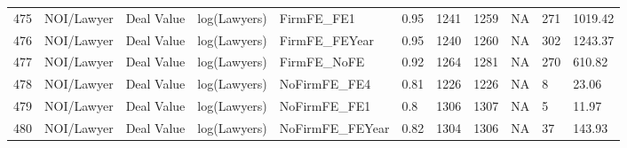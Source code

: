 \documentclass{article}
\begin{document}
\begin{table}[H]
\begin{tabular}{rllllllllll}
  475 & NOI/Lawyer & Deal Value & log(Lawyers) & FirmFE\_FE1 & 0.95 & 1241 & 1259 & NA & 271 & 1019.42 \\ 
  476 & NOI/Lawyer & Deal Value & log(Lawyers) & FirmFE\_FEYear & 0.95 & 1240 & 1260 & NA & 302 & 1243.37 \\ 
  477 & NOI/Lawyer & Deal Value & log(Lawyers) & FirmFE\_NoFE & 0.92 & 1264 & 1281 & NA & 270 & 610.82 \\ 
  478 & NOI/Lawyer & Deal Value & log(Lawyers) & NoFirmFE\_FE4 & 0.81 & 1226 & 1226 & NA & 8 & 23.06 \\ 
  479 & NOI/Lawyer & Deal Value & log(Lawyers) & NoFirmFE\_FE1 & 0.8 & 1306 & 1307 & NA & 5 & 11.97 \\ 
  480 & NOI/Lawyer & Deal Value & log(Lawyers) & NoFirmFE\_FEYear & 0.82 & 1304 & 1306 & NA & 37 & 143.93 \\ 
   \hline
\end{tabular}
\end{table}
\end{document}
